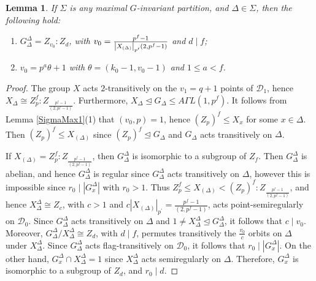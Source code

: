 \documentclass[a4paper,twopage,reqno,12pt]{amsart}
\newtheorem{lemma}[theorem]{Lemma}
\theoremstyle{definition}
\numberwithin{equation}{section}
\renewcommand{\leq}{\leqslant}
\begin{document}
\begin{lemma}
\label{OndaDobro}If $\Sigma $ is any maximal $G$-invariant partition, and $\Delta \in \Sigma$, then the following hold:
\begin{enumerate}
    \item $G_{\Delta }^{\Delta }=Z_{v_{0}}:Z_{d}$, with $v_{0}=\frac{p^{f}-1}{%
\left\vert X_{(\Delta )}\right\vert _{p^{\prime }}(2,p^{f}-1)}$ and $d\mid f$;
  \item  $v_{0}=p^{a}\theta +1$ with $\theta =\left( k_{0}-1,v_{0}-1\right) $
and $1\leq a <f$.
\end{enumerate}
\end{lemma}

\begin{proof}
The group $X$ acts $2$-transitively on the $v_{1}=q+1$ points of $\mathcal{D}_{1}$, hence $X_{\Delta }\cong Z^{f}_{p}:Z_{\frac{p^{f}-1}{(2,p^{f}-1)}}$. Furthermore, $X_{\Delta }\trianglelefteq G_{\Delta }\leq A\Gamma L(1,p^{f})$. It follows from Lemma \ref{SigmaMax1}(1) that $(v_{0},p)=1$, hence $(Z_{p})^{f}\leq X_{x}$ for some $x\in \Delta $. Then $(Z_{p})^{f}\leq X_{(\Delta )}$ since $(Z_{p})^{f}\trianglelefteq G_{\Delta }$ and $G_{\Delta }$ acts
transitively on $\Delta $.

If $X_{(\Delta )}=Z_{p}^{f}:Z_{\frac{p^{f}-1}{(2,p^{f}-1)}}$, then $%
G_{\Delta }^{\Delta }$ is isomorphic to a subgroup of $Z_{f}$. Then $%
G_{\Delta }^{\Delta }$ is abelian, and hence $G_{\Delta }^{\Delta }$ is
regular since $G_{\Delta }^{\Delta }$ acts transitively on $\Delta $,
however this is impossible since $r_{0}\mid \left\vert G_{x}^{\Delta
}\right\vert $ with $r_{0}>1$. Thus $Z_{p}^{f}\leq X_{(\Delta )}<
(Z_{p})^{f}:Z_{\frac{p^{f}-1}{(2,p^{f}-1)}}$, and hence $X_{\Delta }^{\Delta
}\cong Z_{c}$, with $c>1$ and $c\left\vert X_{(\Delta )}\right\vert _{p^{\prime }}=%
\frac{p^{f}-1}{(2,p^{f}-1)}$, acts point-semiregularly on $%
\mathcal{D}_{0}$. Since $G_{\Delta }^{\Delta }$ acts transitively on $\Delta 
$ and $1\neq X_{\Delta }^{\Delta }\trianglelefteq G_{\Delta }^{\Delta }$, it
follows that $c\mid v_{0}$. Moreover, $G_{\Delta }^{\Delta }/X_{\Delta
}^{\Delta }\cong Z_{d}$, with $d\mid f$, permutes transitively the $\frac{v_{0}%
}{c}$ orbits on $\Delta $ under $X_{\Delta }^{\Delta }$. Since $G_{\Delta
}^{\Delta }$ acts flag-transitively on $\mathcal{D}_{0}$, it follows that $%
r_{0}\mid \left\vert G_{x}^{\Delta }\right\vert $. On the other hand, $%
G_{x}^{\Delta }\cap X_{\Delta }^{\Delta }=1$ since $X_{\Delta }^{\Delta }$
acts semiregularly on $\Delta $. Therefore, $G_{x}^{\Delta }$ is isomorphic
to a subgroup of $Z_{d}$, and $r_{0}\mid d$.


\end{proof}
\end{document}

